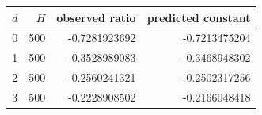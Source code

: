 \begin{tabular}{rrrr}
\toprule
$d$ & $H$ & observed ratio & predicted constant\\
\midrule
0 & 500 & -0.7281923692 & -0.7213475204\\
1 & 500 & -0.3528989083 & -0.3468948302\\
2 & 500 & -0.2560241321 & -0.2502317256\\
3 & 500 & -0.2228908502 & -0.2166048418\\
\bottomrule
\end{tabular}
